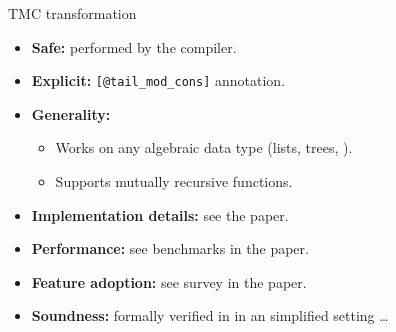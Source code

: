 \begin{frame}{TMC transformation}
\large
\begin{itemize}
  \setlength\itemsep{0.3em}
  \item \textbf{Safe:} performed by the \OCaml compiler.
  \item \textbf{Explicit:} \texttt{[@tail\_mod\_cons]} annotation.
  \setlength\itemsep{1.7em}
  \item \textbf{Generality:}
    \begin{itemize}
      \item Works on any algebraic data type (lists, trees, \etc).
      \item Supports mutually recursive functions.
    \end{itemize}
  \item \textbf{Implementation details:} see the paper.
  \setlength\itemsep{0.3em}
  \item \textbf{Performance:} see benchmarks in the paper.
  \item \textbf{Feature adoption:} see survey in the paper.
  \setlength\itemsep{1.7em}
  \item \textbf{Soundness:} formally verified in \Coq in an simplified setting \dots
\end{itemize}
\end{frame}